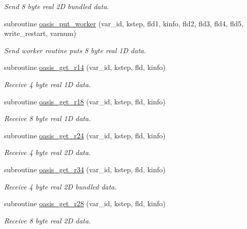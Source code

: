 \begin{DoxyCompactItemize}
\begin{DoxyCompactList}\small\item\em Send 8 byte real 2D bundled data. \end{DoxyCompactList}\item 
subroutine \hyperlink{namespacemod__oasis__getput__interface_a13fcf0d2a7c31cfbbb24087d24c4f851}{oasis\+\_\+put\+\_\+worker} (var\+\_\+id, kstep, fld1, kinfo, fld2, fld3, fld4, fld5, write\+\_\+restart, varnum)
\begin{DoxyCompactList}\small\item\em Send worker routine puts 8 byte real 1D data. \end{DoxyCompactList}\item 
subroutine \hyperlink{namespacemod__oasis__getput__interface_a49f5cde883b1f5210e58c709e944df7c}{oasis\+\_\+get\+\_\+r14} (var\+\_\+id, kstep, fld, kinfo)
\begin{DoxyCompactList}\small\item\em Receive 4 byte real 1D data. \end{DoxyCompactList}\item 
subroutine \hyperlink{namespacemod__oasis__getput__interface_a10fac7c611232bd788e32c0487ee5625}{oasis\+\_\+get\+\_\+r18} (var\+\_\+id, kstep, fld, kinfo)
\begin{DoxyCompactList}\small\item\em Receive 8 byte real 1D data. \end{DoxyCompactList}\item 
subroutine \hyperlink{namespacemod__oasis__getput__interface_ac28a61cf8ca51e358897bfffb43003b8}{oasis\+\_\+get\+\_\+r24} (var\+\_\+id, kstep, fld, kinfo)
\begin{DoxyCompactList}\small\item\em Receive 4 byte real 2D data. \end{DoxyCompactList}\item 
subroutine \hyperlink{namespacemod__oasis__getput__interface_a34b0221d424ce7f1597548f91407033f}{oasis\+\_\+get\+\_\+r34} (var\+\_\+id, kstep, fld, kinfo)
\begin{DoxyCompactList}\small\item\em Receive 4 byte real 2D bundled data. \end{DoxyCompactList}\item 
subroutine \hyperlink{namespacemod__oasis__getput__interface_a017bdff12b2f7c29e6e76b303d452d4b}{oasis\+\_\+get\+\_\+r28} (var\+\_\+id, kstep, fld, kinfo)
\begin{DoxyCompactList}\small\item\em Receive 8 byte real 2D data. \end{DoxyCompactList}\item 

\end{DoxyCompactItemize}
